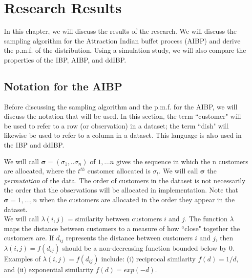 \chapter{Research Results}
In this chapter, we will discuss the results of the research. We will discuss
the sampling algorithm for the Attraction Indian buffet process (AIBP) and
derive the p.m.f. of the distribution. Using a simulation study, we will also
compare the properties of the IBP, AIBP, and ddIBP.

\section{Notation for the AIBP}
Before discussing the sampling algorithm and the p.m.f. for the AIBP,  we will 
discuss the notation that will be used. In this section, the term ``customer" will
be used to refer to a row (or observation) in a dataset; the term ``dish" will
likewise be used to refer to a column in a dataset. This language is also used in
the IBP and ddIBP.

\noindent
We will call $\bm \sigma = (\sigma_1,..\sigma_n)$ of ${1,...n}$ gives the
sequence in which the n customers are allocated, where the $t^{th}$ customer
allocated is $\sigma_t$. We will call $\bm \sigma$ the \textit{permutation} of
the data.  The order of customers in the dataset is not necessarily the order
that the observations will be allocated in implementation. Note that $\bm
\sigma = {1,...,n}$ when the customers are allocated in the order they appear
in the dataset.\\
\noindent
We will call $\lambda(i,j)$ = similarity between customers $i$ and $j$. The
function $\lambda$ maps the distance between customers to a measure of how
``close" together the customers are. If $d_{ij}$ represents the distance
between customers $i$ and $j$, then $\lambda(i,j)=f(d_{ij})$ should be a
non-decreasing function bounded below by 0. Examples of
$\lambda(i,j)=f(d_{ij})$ include: (i) reciprocal similarity $f(d) = 1/d$, and
(ii) exponential similarity $f(d) = exp(-d)$.\\

